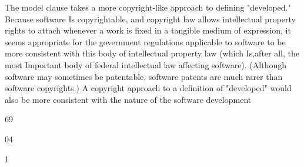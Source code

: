 \documentclass[12pt]{article}
\begin{document}
The model clause takes a more copyright-like approach to defining "developed." Because software Is
copyrightable, and copyright law allows intellectual property rights to attach whenever a work is fixed
in a tangible medium of expression, it seems appropriate for the government regulations applicable to
software to be more consistent with this body of intellectual property law (which Is,after all, the most
Important body of federal intellectual law affecting software). (Although software may sometimes be
patentable, software patents are much rarer than software copyrights.) A copyright approach to a
definition of "developed" would also be more consistent with the nature of the software development

69

04%

1
\end{document}
